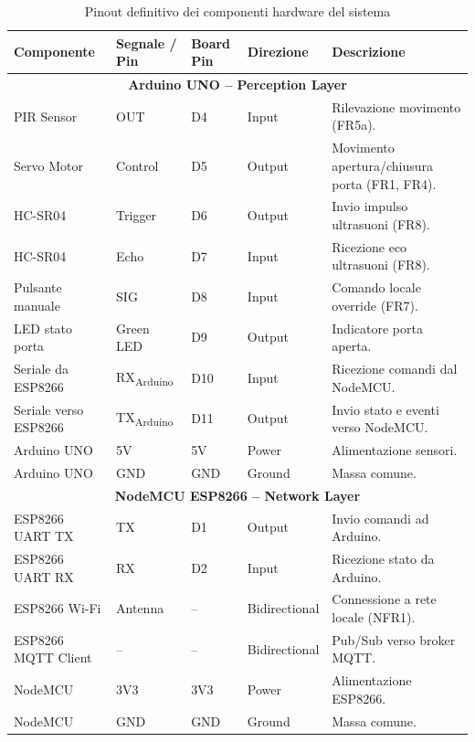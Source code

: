 \begin{table}[H]
\centering
\caption{Pinout definitivo dei componenti hardware del sistema}
\label{tab:pinouttable}


\begin{tabular}{|p{3.2cm}|p{2cm}|p{2cm}|p{2cm}|p{4cm}|}
\hline
\textbf{Componente} & \textbf{Segnale / Pin} & \textbf{Board Pin} & \textbf{Direzione} & \textbf{Descrizione} \\
\hline

\multicolumn{5}{|c|}{\textbf{Arduino UNO – Perception Layer}} \\ \hline
PIR Sensor & OUT & D4 & Input & Rilevazione movimento (FR5a). \\ \hline
Servo Motor & Control & D5 & Output & Movimento apertura/chiusura porta (FR1, FR4). \\ \hline
HC-SR04 & Trigger & D6 & Output & Invio impulso ultrasuoni (FR8). \\ \hline
HC-SR04 & Echo & D7 & Input & Ricezione eco ultrasuoni (FR8). \\ \hline
Pulsante manuale & SIG & D8 & Input & Comando locale override (FR7). \\ \hline
LED stato porta & Green LED & D9 & Output & Indicatore porta aperta. \\ \hline
Seriale da ESP8266 & RX\textsubscript{Arduino} & D10 & Input & Ricezione comandi dal NodeMCU. \\ \hline
Seriale verso ESP8266 & TX\textsubscript{Arduino} & D11 & Output & Invio stato e eventi verso NodeMCU. \\ \hline
Arduino UNO & 5V & 5V & Power & Alimentazione sensori. \\ \hline
Arduino UNO & GND & GND & Ground & Massa comune. \\ \hline

\multicolumn{5}{|c|}{\textbf{NodeMCU ESP8266 – Network Layer}} \\ \hline
ESP8266 UART TX & TX & D1 & Output & Invio comandi ad Arduino. \\ \hline
ESP8266 UART RX & RX & D2 & Input & Ricezione stato da Arduino. \\ \hline
ESP8266 Wi-Fi & Antenna & -- & Bidirectional & Connessione a rete locale (NFR1). \\ \hline
ESP8266 MQTT Client & -- & -- & Bidirectional & Pub/Sub verso broker MQTT. \\ \hline
NodeMCU & 3V3 & 3V3 & Power & Alimentazione ESP8266. \\ \hline
NodeMCU & GND & GND & Ground & Massa comune. \\ \hline


\end{tabular}
\end{table}
